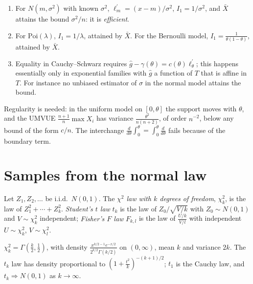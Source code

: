 \begin{example}\label{statistics:example-cramer-rao}
\begin{enumerate}
\item For $N(m, \sigma^2)$ with known $\sigma^2$, $\ell^{\prime}_m = (x - m)/\sigma^2$, $I_1 = 1/\sigma^2$, and $\bar X$ attains the bound $\sigma^2/n$: it is \emph{efficient}.
\item For $\mathrm{Poi}(\lambda)$, $I_1 = 1/\lambda$, attained by $\bar X$. For the Bernoulli model, $I_1 = \frac{1}{\theta(1 - \theta)}$, attained by $\bar X$.
\item Equality in Cauchy--Schwarz requires $\hat g - \gamma(\theta) = c(\theta)\ell^{\prime}_\theta$; this happens essentially only in exponential families with $\hat g$ a function of $T$ that is affine in $T$. For instance no unbiased
estimator of $\sigma$ in the normal model attains the bound.
\end{enumerate}
\end{example}

\begin{counterexample}\label{statistics:counterexample-cramer-rao}
Regularity is needed: in the uniform model on $[0, \theta]$ the support moves with $\theta$, and the UMVUE $\frac{n+1}{n}\max X_i$ has variance $\frac{\theta^2}{n(n + 2)}$, of order $n^{-2}$, below any bound of the form $c/n$. The
interchange $\frac{d}{d\theta}\int_0^\theta = \int_0^\theta\frac{d}{d\theta}$ fails because of the boundary term.
\end{counterexample}

\section{Samples from the normal law}\label{statistics:section-normal-samples}

\begin{definition}\label{statistics:definition-chi-square}
Let $Z_1, Z_2, \ldots$ be i.i.d.\ $N(0, 1)$. The \emph{$\chi^2$ law with $k$ degrees of freedom}, $\chi^2_k$, is the law of $Z_1^2 + \cdots + Z_k^2$. \emph{Student's $t$ law} $t_k$ is the law of $Z_0/\sqrt{V/k}$ with $Z_0 \sim N(0, 1)$ and
$V \sim \chi^2_k$ independent; \emph{Fisher's $F$ law} $F_{k,l}$ is the law of $\frac{U/k}{V/l}$ with independent $U \sim \chi^2_k$, $V \sim \chi^2_l$.
\end{definition}

\begin{proposition}\label{statistics:proposition-chi-square}
$\chi^2_k = \Gamma(\frac k2, \frac12)$, with density $\frac{x^{k/2-1}e^{-x/2}}{2^{k/2}\Gamma(k/2)}$ on $(0, \infty)$, mean $k$ and variance $2k$. The $t_k$ law has density proportional to $(1 + \frac{t^2}{k})^{-(k+1)/2}$; $t_1$ is the Cauchy law,
and $t_k \Rightarrow N(0, 1)$ as $k \to \infty$.
\end{proposition}

